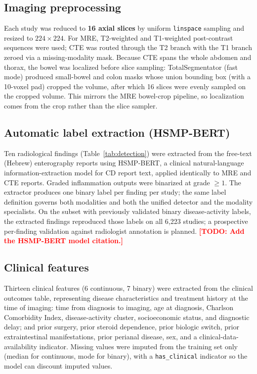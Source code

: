 \documentclass[11pt]{article}
\newcommand{\TODO}[1]{\textcolor{red}{\textbf{[TODO: #1]}}}
\begin{document}
\subsection*{Imaging preprocessing}

Each study was reduced to \textbf{16 axial slices} by uniform \texttt{linspace} sampling and resized to
$224 \times 224$. For MRE, T2-weighted and T1-weighted post-contrast sequences were used; CTE was routed
through the T2 branch with the T1 branch zeroed via a missing-modality mask. Because CTE spans the whole
abdomen and thorax, the bowel was localized before slice sampling: TotalSegmentator \cite{wasserthal2023totalseg}
(fast mode) produced small-bowel and colon masks whose union bounding box (with a 10-voxel pad) cropped the
volume, after which 16 slices were evenly sampled on the cropped volume. This mirrors the MRE bowel-crop
pipeline, so localization comes from the crop rather than the slice sampler.

\subsection*{Automatic label extraction (HSMP-BERT)}

Ten radiological findings (Table~\ref{tab:detection}) were extracted from the free-text (Hebrew)
enterography reports using HSMP-BERT, a clinical natural-language information-extraction model for CD
report text, applied identically to MRE and CTE reports. Graded inflammation outputs were binarized at
grade $\geq 1$. The extractor produces one binary label per finding per study; the same label definition
governs both modalities and both the unified detector and the modality specialists. On the subset with
previously validated binary disease-activity labels, the extracted findings reproduced those labels on
all 6,223 studies; a prospective per-finding validation against radiologist annotation is planned.
\TODO{Add the HSMP-BERT model citation.}

\subsection*{Clinical features}

Thirteen clinical features (6 continuous, 7 binary) were extracted from the clinical outcomes table,
representing disease characteristics and treatment history at the time of imaging: time from diagnosis to
imaging, age at diagnosis, Charlson Comorbidity Index, disease-activity cluster, socioeconomic status, and
diagnostic delay; and prior surgery, prior steroid dependence, prior biologic switch, prior extraintestinal
manifestations, prior perianal disease, sex, and a clinical-data-availability indicator. Missing values were
imputed from the training set only (median for continuous, mode for binary), with a \texttt{has\_clinical}
indicator so the model can discount imputed values.
\end{document}
